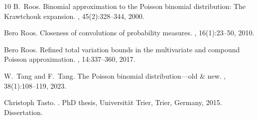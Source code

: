 \documentclass[11pt]{amsart}
\theoremstyle{plain}
\theoremstyle{definition}
\begin{document}
\begin{thebibliography}{10}
B.~Roos.
\newblock Binomial approximation to the {P}oisson binomial distribution: The
  {K}rawtchouk expansion.
, 45(2):328--344,
  2000.

Bero Roos.
\newblock Closeness of convolutions of probability measures.
, 16(1):23--50, 2010.

Bero Roos.
\newblock Refined total variation bounds in the multivariate and compound
  {P}oisson approximation.
, 14:337--360, 2017.

W.~Tang and F.~Tang.
\newblock The {P}oisson binomial distribution---old \& new.
, 38(1):108--119, 2023.

Christoph Tasto.
.
\newblock PhD thesis, Universit{\"a}t Trier, Trier, Germany, 2015.
\newblock Dissertation.

\end{thebibliography}
\end{document}
